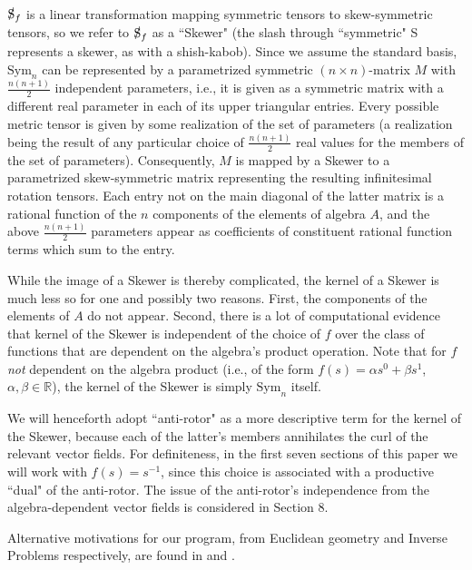 \documentclass{amsart}
\theoremstyle{definition}
\numberwithin{theorem}{section}
\numberwithin{equation}{section}
\begin{document}
$\slashed{\text{S}}_f$ is a linear transformation mapping symmetric tensors to skew-symmetric tensors, so we refer to $\slashed{\text{S}}_f$ as a ``Skewer" (the slash through ``symmetric" S represents a skewer, as with a shish-kabob). Since we assume the standard basis, $\text{Sym}_n$ can be represented by a parametrized symmetric $(n\times n)$-matrix $M$ with $\frac{n(n+1)}{2}$ independent parameters, i.e., it is given as a symmetric matrix with a different real parameter in each of its upper triangular entries.  Every possible metric tensor is given by some realization of the set of parameters (a realization being the result of any particular choice of $\frac{n(n+1)}{2}$ real values for the members of the set of parameters).  Consequently, $M$ is mapped by a Skewer to a parametrized skew-symmetric matrix representing the resulting infinitesimal rotation tensors.  Each entry not on the main diagonal of the latter matrix is a rational function of the $n$ components of the elements of algebra $A$, and the above $\frac{n(n+1)}{2}$ parameters appear as coefficients of constituent rational function terms which sum to the entry.  

While the image of a Skewer is thereby complicated, the kernel of a Skewer is much less so for one and possibly two reasons.  First, the components of the elements of $A$ do not appear.  Second, there is a lot of computational evidence that kernel of the Skewer is independent of the choice of $f$ over the class of functions that are dependent on the algebra's product operation.   Note that for $f$ {\it not} dependent on the algebra product (i.e., of the form $f(s) = \alpha s^0 + \beta s^1$, $\alpha,\beta\in\mathbb{R}$), the kernel of the Skewer is simply $\text{Sym}_n$ itself.  

We will henceforth adopt ``anti-rotor" as a more descriptive term for the kernel of the Skewer, because each of the latter's members annihilates the curl of the relevant vector fields. 
For definiteness, in the first seven sections of this paper we will work with $f(s)=s^{-1}$, since this choice is associated with a productive ``dual" of the anti-rotor.  The issue of the anti-rotor's independence from the algebra-dependent vector fields is considered in Section 8.

Alternative motivations for our program, from Euclidean geometry and Inverse Problems respectively, are found in \cite{fgreensite:2025b} and \cite{fgreensite:2025c}.


\enlargethispage{1.5cm}
\end{document}
